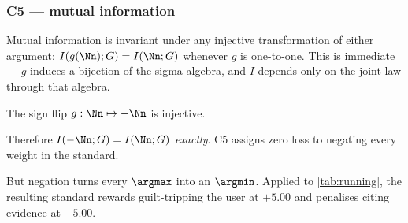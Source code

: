 \subsubsection{C5 --- mutual information}
\label{sec:c5def}




\begin{steps}
\item Mutual information is invariant under any injective transformation of
either argument: $I(g(\Nn);G) = I(\Nn;G)$ whenever $g$ is one-to-one. This is
immediate --- $g$ induces a bijection of the sigma-algebra, and $I$ depends only
on the joint law through that algebra.
\item The sign flip $g: \Nn \mapsto -\Nn$ is injective.
\item Therefore $I(-\Nn;G) = I(\Nn;G)$ \emph{exactly}. C5 assigns zero loss to
negating every weight in the standard.
\item But negation turns every $\argmax$ into an $\argmin$. Applied to
\cref{tab:running}, the resulting standard rewards guilt-tripping the user at
$+5.00$ and penalises citing evidence at $-5.00$.
\end{steps}

